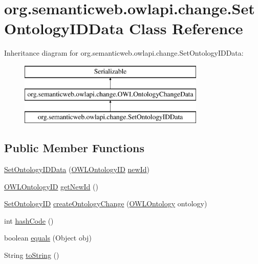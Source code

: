 \hypertarget{classorg_1_1semanticweb_1_1owlapi_1_1change_1_1_set_ontology_i_d_data}{\section{org.\-semanticweb.\-owlapi.\-change.\-Set\-Ontology\-I\-D\-Data Class Reference}
\label{classorg_1_1semanticweb_1_1owlapi_1_1change_1_1_set_ontology_i_d_data}
}
Inheritance diagram for org.\-semanticweb.\-owlapi.\-change.\-Set\-Ontology\-I\-D\-Data\-:\begin{figure}[H]
\begin{center}
\leavevmode
\includegraphics[height=3.000000cm]{classorg_1_1semanticweb_1_1owlapi_1_1change_1_1_set_ontology_i_d_data}
\end{center}
\end{figure}
\subsection*{Public Member Functions}
\begin{DoxyCompactItemize}
\item 
\hyperlink{classorg_1_1semanticweb_1_1owlapi_1_1change_1_1_set_ontology_i_d_data_a60042d5a703ba05b65a11b2424f95cba}{Set\-Ontology\-I\-D\-Data} (\hyperlink{classorg_1_1semanticweb_1_1owlapi_1_1model_1_1_o_w_l_ontology_i_d}{O\-W\-L\-Ontology\-I\-D} \hyperlink{classorg_1_1semanticweb_1_1owlapi_1_1change_1_1_set_ontology_i_d_data_acbb6b0c41d0a5dfe7a7ae7388dd25f49}{new\-Id})
\item 
\hyperlink{classorg_1_1semanticweb_1_1owlapi_1_1model_1_1_o_w_l_ontology_i_d}{O\-W\-L\-Ontology\-I\-D} \hyperlink{classorg_1_1semanticweb_1_1owlapi_1_1change_1_1_set_ontology_i_d_data_aa949ee983be541e6dc1a016952562db6}{get\-New\-Id} ()
\item 
\hyperlink{classorg_1_1semanticweb_1_1owlapi_1_1model_1_1_set_ontology_i_d}{Set\-Ontology\-I\-D} \hyperlink{classorg_1_1semanticweb_1_1owlapi_1_1change_1_1_set_ontology_i_d_data_a685028e38adb58497de9d3b48c4264bb}{create\-Ontology\-Change} (\hyperlink{interfaceorg_1_1semanticweb_1_1owlapi_1_1model_1_1_o_w_l_ontology}{O\-W\-L\-Ontology} ontology)
\item 
int \hyperlink{classorg_1_1semanticweb_1_1owlapi_1_1change_1_1_set_ontology_i_d_data_a446e5f8cebe766110b8cdb62ec65091b}{hash\-Code} ()
\item 
boolean \hyperlink{classorg_1_1semanticweb_1_1owlapi_1_1change_1_1_set_ontology_i_d_data_ab930385e99102b14bea1057952d8d8dc}{equals} (Object obj)
\item 
String \hyperlink{classorg_1_1semanticweb_1_1owlapi_1_1change_1_1_set_ontology_i_d_data_a45192b408e47ec7e73891dd8eb70b1f8}{to\-String} ()
\end{DoxyCompactItemize}
